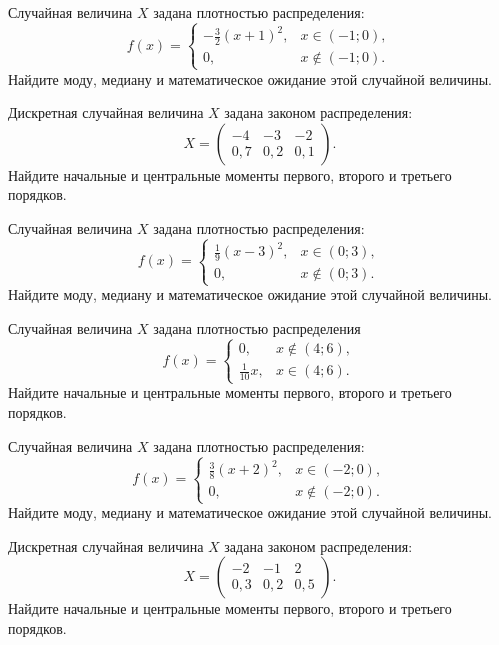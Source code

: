 \vfill

\newpage\setcounter{zad}{0}

\z Случайная величина $X$ задана плотностью распределения: $$f(x) = \begin{cases} -\frac{3}{2}(x+1)^2, & x \in (-1; 0), \\ 0, & x \not\in (-1; 0). \end{cases}$$ Найдите моду, медиану и математическое ожидание этой случайной величины.


\vfill

\z Дискретная случайная величина $X$ задана законом распределения: $$ X = \left(\begin{array}{rrr}-4 & -3 & -2\\0{,}7 & 0{,}2 & 0{,}1\end{array}\right).$$ Найдите начальные и центральные моменты первого, второго и третьего порядков.
 

\vfill

\newpage\setcounter{zad}{0}

\z Случайная величина $X$ задана плотностью распределения: $$f(x) = \begin{cases} \frac{1}{9}(x-3)^2, & x \in (0; 3), \\ 0, & x \not\in (0; 3). \end{cases}$$ Найдите моду, медиану и математическое ожидание этой случайной величины.


\vfill

\z Случайная величина $X$ задана плотностью распределения $$f(x) = \begin{cases}0, & x\not\in(4; 6), \\ \frac{1}{10}x, & x\in(4; 6).\end{cases}$$ Найдите начальные и центральные моменты первого, второго и третьего порядков.
 

\vfill

\newpage\setcounter{zad}{0}

\z Случайная величина $X$ задана плотностью распределения: $$f(x) = \begin{cases} \frac{3}{8}(x+2)^2, & x \in (-2; 0), \\ 0, & x \not\in (-2; 0). \end{cases}$$ Найдите моду, медиану и математическое ожидание этой случайной величины.


\vfill

\z Дискретная случайная величина $X$ задана законом распределения: $$ X = \left(\begin{array}{rrr}-2 & -1 & 2\\0{,}3 & 0{,}2 & 0{,}5\end{array}\right).$$ Найдите начальные и центральные моменты первого, второго и третьего порядков.
 


